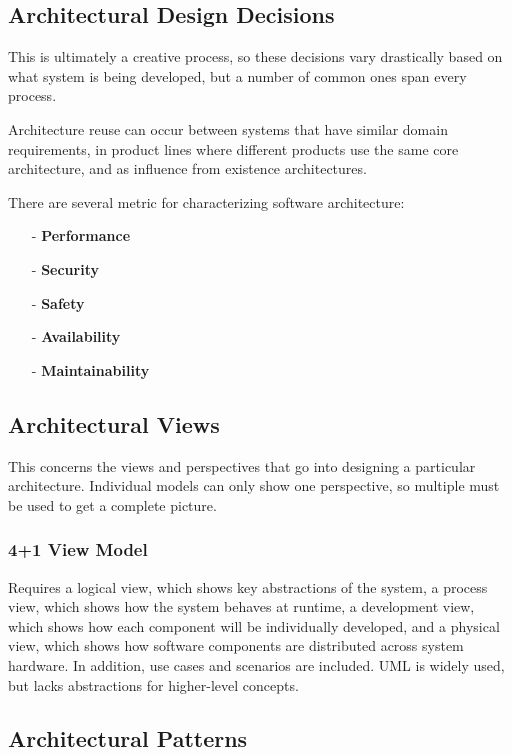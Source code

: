 \documentclass[12pt]{article}
\begin{document}
\subsection*{Architectural Design Decisions}

This is ultimately a creative process, so these decisions vary drastically based on what system is being developed, but a number of common ones span every process.

Architecture reuse can occur between systems that have similar domain requirements, in product lines where different products use the same core architecture, and as influence from existence architectures.

There are several metric for characterizing software architecture:
\begin{itemize}
    \item [-] \textbf{Performance}
    \item [-] \textbf{Security}
    \item [-] \textbf{Safety}
    \item [-] \textbf{Availability}
    \item [-] \textbf{Maintainability}
\end{itemize}

\subsection*{Architectural Views}

This concerns the views and perspectives that go into designing a particular architecture. Individual models can only show one perspective, so multiple must be used to get a complete picture.

\subsubsection*{4+1 View Model}

Requires a logical view, which shows key abstractions of the system, a process view, which shows how the system behaves at runtime, a development view, which shows how each component will be individually developed, and a physical view, which shows how software components are distributed across system hardware. In addition, use cases and scenarios are included. UML is widely used, but lacks abstractions for higher-level concepts.

\subsection*{Architectural Patterns}
\end{document}
